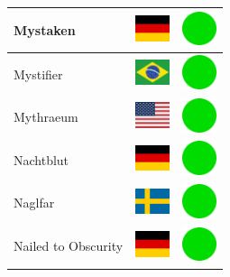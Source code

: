 \documentclass[12pt, a4paper, twoside]{report}
\begin{document}
\begin{center}
\begin{longtable}{|p{5cm}|p{2cm}|p{2cm}|}
 Mystaken                                                   & \includegraphics[width=1cm]{../img/flags/de} &   \includegraphics[width=1cm]{../likes/y} \\ \hline
 Mystifier                                                  & \includegraphics[width=1cm]{../img/flags/br} &   \includegraphics[width=1cm]{../likes/y} \\ \hline
 Mythraeum                                                  & \includegraphics[width=1cm]{../img/flags/us} &   \includegraphics[width=1cm]{../likes/y} \\ \hline
 Nachtblut                                                  & \includegraphics[width=1cm]{../img/flags/de} &   \includegraphics[width=1cm]{../likes/y} \\ \hline
 Naglfar                                                    & \includegraphics[width=1cm]{../img/flags/se} &   \includegraphics[width=1cm]{../likes/y} \\ \hline
 Nailed to Obscurity                                        & \includegraphics[width=1cm]{../img/flags/de} &   \includegraphics[width=1cm]{../likes/y} \\ \hline

\end{longtable}
\end{center}
\end{document}
